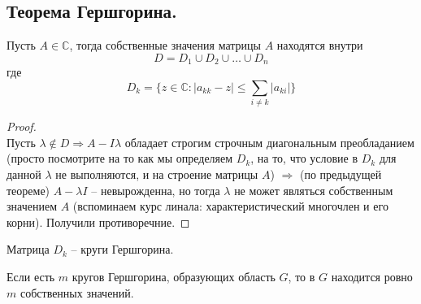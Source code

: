 \subsection{Теорема Гершгорина.}
\begin{theorem*}
    Пусть $A \in \mathbb{C}$, тогда собственные значения матрицы $A$ находятся внутри\\
    \[D = D_1 \cup D_2 \cup \ldots \cup D_n\] где
    \[ \displaystyle D_k = \{z \in \mathbb{C} : |a_{kk} - z| \leqslant \sum_{i \neq k}|a_{ki}|\}\]  
\end{theorem*}
\begin{proof} \ \\
    \indent Пусть $\lambda \not \in D \Rightarrow A - I\lambda$ обладает строгим строчным
    диагональным преобладанием (просто посмотрите на то как мы определяем $D_k$, на то, что условие
    в $D_k$ для данной $\lambda$ не выполняются, и на строение
    матрицы $A$) $\Rightarrow$ (по предыдущей теореме) $A - \lambda I$ -- невырожденна, но
    тогда $\lambda$ не может являться собственным значением $A$ (вспоминаем курс линала: характеристический
    многочлен и его корни). Получили противоречние.
\end{proof}

\begin{definition*}
    Матрица $D_k$ -- круги Гершгорина.
\end{definition*}


\begin{theorem*}
    Если есть $m$ кругов Гершгорина, образующих область $G$, то в $G$ находится ровно
    $m$ собственных значений.
\end{theorem*}